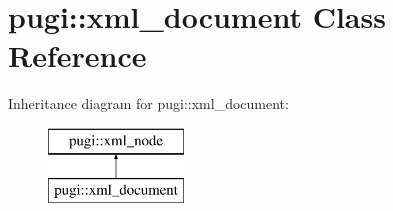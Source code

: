 \hypertarget{classpugi_1_1xml__document}{\section{pugi\-:\-:xml\-\_\-document Class Reference}
\label{classpugi_1_1xml__document}
}
Inheritance diagram for pugi\-:\-:xml\-\_\-document\-:\begin{figure}[H]
\begin{center}
\leavevmode
\includegraphics[height=2.000000cm]{classpugi_1_1xml__document}
\end{center}
\end{figure}
